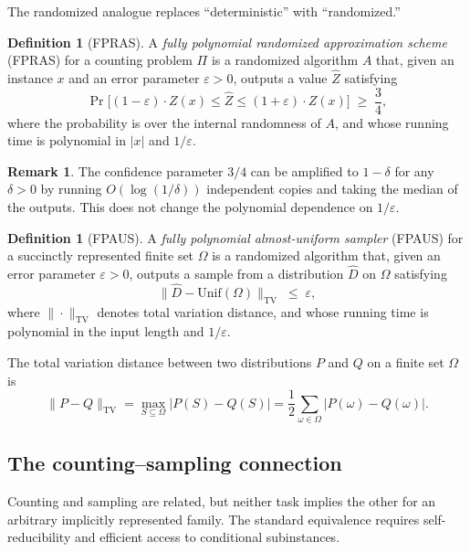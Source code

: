 \documentclass[twoside,12pt]{book}
\theoremstyle{plain}
\theoremstyle{definition}
\newtheorem{definition}[theorem]{Definition}
\newtheorem{remark}[theorem]{Remark}
\theoremstyle{remark}
\begin{document}
The randomized analogue replaces ``deterministic'' with ``randomized.''

\begin{definition}[FPRAS]
A \emph{fully polynomial randomized approximation scheme} (FPRAS) for a counting problem $\Pi$ is a randomized algorithm $A$ that, given an instance $x$ and an error parameter $\varepsilon > 0$, outputs a value $\hat{Z}$ satisfying
\[
\Pr\!\bigl[(1 - \varepsilon) \cdot Z(x) \leq \hat{Z} \leq (1 + \varepsilon) \cdot Z(x)\bigr] \;\geq\; \frac{3}{4},
\]
where the probability is over the internal randomness of $A$, and whose running time is polynomial in $|x|$ and $1/\varepsilon$.
\end{definition}

\begin{remark}
The confidence parameter $3/4$ can be amplified to $1 - \delta$ for any $\delta > 0$ by running $O(\log(1/\delta))$ independent copies and taking the median of the outputs. This does not change the polynomial dependence on $1/\varepsilon$.
\end{remark}

\begin{definition}[FPAUS]
A \emph{fully polynomial almost-uniform sampler} (FPAUS) for a succinctly
represented finite set $\Omega$ is a randomized algorithm that, given an error
parameter $\varepsilon > 0$, outputs a sample from a distribution $\hat{D}$
on $\Omega$ satisfying
\[
\bigl\| \hat{D} - \text{Unif}(\Omega) \bigr\|_{\mathrm{TV}} \;\leq\; \varepsilon,
\]
where $\|\cdot\|_{\mathrm{TV}}$ denotes total variation distance, and whose
running time is polynomial in the input length and $1/\varepsilon$.
\end{definition}

The total variation distance between two distributions $P$ and $Q$ on a finite set $\Omega$ is
\[
\bigl\| P - Q \bigr\|_{\mathrm{TV}} = \max_{S \subseteq \Omega} \bigl| P(S) - Q(S) \bigr| = \frac{1}{2} \sum_{\omega \in \Omega} \bigl| P(\omega) - Q(\omega) \bigr|.
\]

\subsection{The counting--sampling connection}

Counting and sampling are related, but neither task implies the other for an
arbitrary implicitly represented family. The standard equivalence requires
self-reducibility and efficient access to conditional subinstances.
\end{document}
